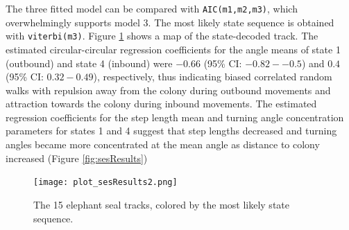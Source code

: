 \documentclass[12pt]{article}\usepackage[]{graphicx}\usepackage[]{xcolor}
\begin{document}
The three fitted model can be compared with \verb|AIC(m1,m2,m3)|, which overwhelmingly supports model 3. The most likely state sequence is obtained with \verb|viterbi(m3)|. Figure \ref{fig:sesTracks} shows a map of the state-decoded track. The estimated circular-circular regression coefficients for the angle means of state 1 (outbound) and state 4 (inbound) were $-0.66$ (95\% CI: $-0.82--0.5$) and $0.4$ (95\% CI: $0.32-0.49$), respectively, thus indicating biased correlated random walks with repulsion away from the colony during outbound movements and attraction towards the colony during inbound movements. The estimated regression coefficients for the step length mean and turning angle concentration parameters for states 1 and 4 suggest that step lengths decreased and turning angles became more concentrated at the mean angle as distance to colony increased (Figure \ref{fig:sesResults})

\begin{figure}[htbp]
  \centering
  \texttt{[image: plot\_sesResults2.png]}
  \caption{The 15 elephant seal tracks, colored by the most likely state sequence.}
  \label{fig:sesTracks}
\end{figure}
\end{document}
